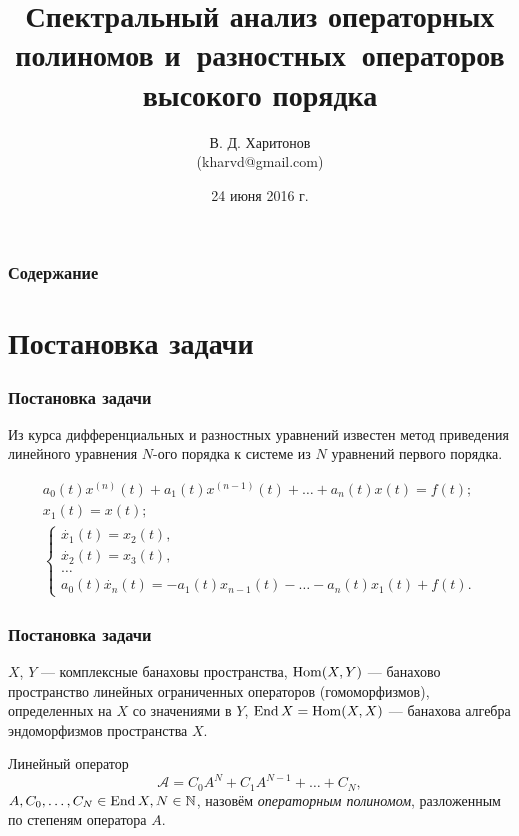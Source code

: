 \documentclass{beamer}
\title{Спектральный анализ операторных полиномов
и~разностных~операторов высокого порядка}
\author{В. Д. Харитонов \\ (kharvd@gmail.com)}
\date{24 июня 2016 г.}
\begin{document}
\frame{\titlepage}

\begin{frame}
    \frametitle{Содержание}
    \tableofcontents
\end{frame}

\section{Постановка задачи}

\begin{frame}
\frametitle{Постановка задачи}

Из курса дифференциальных и разностных уравнений известен метод приведения линейного уравнения $N$-ого порядка к системе из $N$ уравнений первого порядка.

\begin{gather*}
    a_0(t) x^{(n)}(t) + a_1(t) x^{(n-1)}(t) + \dotsc + a_n(t) x(t) = f(t); \\[2em]
    x_1(t) = x(t); \\
    \left\{ \begin{gathered}
        \dot{x_1}(t) = x_2(t), \\
        \dot{x_2}(t) = x_3(t), \\
        \dotsc \\
        a_0(t) \dot{x_n}(t) = -a_1(t) x_{n-1}(t) - \dotsc - a_n(t) x_1(t) + f(t).
    \end{gathered}\right.
\end{gather*}

\end{frame}

\begin{frame}
\frametitle{Постановка задачи}
    $X$, $Y$ --- комплексные банаховы пространства, $\operatorname{Hom}(X, Y)$ --- банахово пространство линейных ограниченных операторов (гомоморфизмов), определенных на $X$ со значениями в $Y$, $\operatorname{End} X = \operatorname{Hom}(X, X)$ --- банахова алгебра эндоморфизмов пространства $X$.

    Линейный оператор
    \[  \mathcal A = C_0 A^N + C_1 A^{N - 1} + \dotsc + C_N, \]
    $A, C_0, \dotsc, C_N \in \operatorname{End} X, N \in \mathbb{N}$, назовём \emph{операторным полиномом}, разложенным по степеням оператора $A$.
\end{frame}
\end{document}
